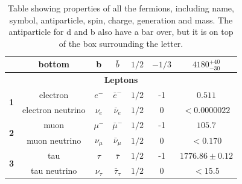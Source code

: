\begin{table}[H]
\begin{tabular}{|ccccccc|}
    \multicolumn{1}{|c|}{}                            & \multicolumn{1}{c|}{bottom}            & \multicolumn{1}{c|}{b}               & \multicolumn{1}{c|}{$\bar{b}$}             & \multicolumn{1}{c|}{$1/2$} & \multicolumn{1}{c|}{$-1/3$}  & $4180_{-30}^{+40}$                             \\ \hline
    \multicolumn{7}{|c|}{\textbf{Leptons}}                                                                                                                                                                                                                                                                               \\ \hline
    \multicolumn{1}{|c|}{\multirow{2}{*}{\textbf{1}}}                & \multicolumn{1}{c|}{electron}          & \multicolumn{1}{c|}{$e^-$}           & \multicolumn{1}{c|}{$\bar{e}^-$}           & \multicolumn{1}{c|}{$1/2$} & \multicolumn{1}{c|}{-1}              & $0.511$                                        \\ \cline{2-7} 
    \multicolumn{1}{|c|}{}                   & \multicolumn{1}{c|}{electron neutrino} & \multicolumn{1}{c|}{$\nu_{e}$}       & \multicolumn{1}{c|}{$\bar{\nu}_e$}         & \multicolumn{1}{c|}{$1/2$} & \multicolumn{1}{c|}{0}               & $<0.0000022$                                   \\ \hline
    \multicolumn{1}{|c|}{\multirow{2}{*}{\textbf{2}}} & \multicolumn{1}{c|}{muon}              & \multicolumn{1}{c|}{$\mu^-$}         & \multicolumn{1}{c|}{$\bar{\mu}^-$}         & \multicolumn{1}{c|}{$1/2$} & \multicolumn{1}{c|}{-1}              & $105.7$                                        \\ \cline{2-7} 
    \multicolumn{1}{|c|}{}                            & \multicolumn{1}{c|}{muon neutrino}     & \multicolumn{1}{c|}{$\nu_{\mu}$}     & \multicolumn{1}{c|}{$\bar{\nu}_{\mu}$}     & \multicolumn{1}{c|}{$1/2$} & \multicolumn{1}{c|}{0}               & $<0.170$                                       \\ \hline
    \multicolumn{1}{|c|}{\multirow{2}{*}{\textbf{3}}} & \multicolumn{1}{c|}{tau}               & \multicolumn{1}{c|}{$\tau$}          & \multicolumn{1}{c|}{$\bar{\tau}$}          & \multicolumn{1}{c|}{$1/2$} & \multicolumn{1}{c|}{-1}              & $1776.86 \pm 0.12$                             \\ \cline{2-7} 
    \multicolumn{1}{|c|}{}                            & \multicolumn{1}{c|}{tau neutrino}      & \multicolumn{1}{c|}{$\nu_{\tau}$}    & \multicolumn{1}{c|}{$\bar{\tau}_{\tau}$}   & \multicolumn{1}{c|}{$1/2$} & \multicolumn{1}{c|}{0}               & $< 15.5$                                       \\ \hline
    \end{tabular}
    \caption{Table showing properties of all the fermions, including name, symbol, antiparticle, spin, charge, generation and mass. The antiparticle for d and b also have a bar over, but it is on top of the box surrounding the letter. }
    \label{tab:fermion_table}
    \end{table}
